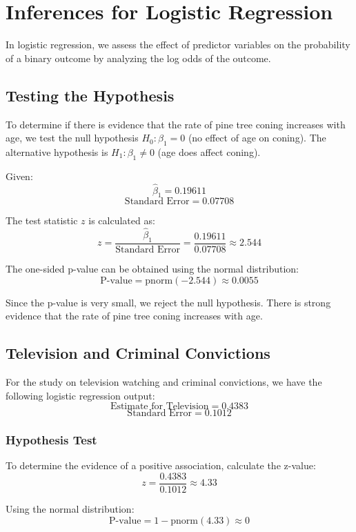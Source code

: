 \documentclass{article}
\begin{document}
\section{Inferences for Logistic Regression}

In logistic regression, we assess the effect of predictor variables on the probability of a binary outcome by analyzing the log odds of the outcome.

\subsection{Testing the Hypothesis}

To determine if there is evidence that the rate of pine tree coning increases with age, we test the null hypothesis \( H_0: \beta_1 = 0 \) (no effect of age on coning). The alternative hypothesis is \( H_1: \beta_1 \neq 0 \) (age does affect coning).

Given:
\[
\hat{\beta}_1 = 0.19611
\]
\[
\text{Standard Error} = 0.07708
\]

The test statistic \( z \) is calculated as:
\[
z = \frac{\hat{\beta}_1}{\text{Standard Error}} = \frac{0.19611}{0.07708} \approx 2.544
\]

The one-sided p-value can be obtained using the normal distribution:
\[
\text{P-value} = \text{pnorm}(-2.544) \approx 0.0055
\]

Since the p-value is very small, we reject the null hypothesis. There is strong evidence that the rate of pine tree coning increases with age.

\subsection{Television and Criminal Convictions}

For the study on television watching and criminal convictions, we have the following logistic regression output:
\[
\text{Estimate for Television} = 0.4383
\]
\[
\text{Standard Error} = 0.1012
\]

\subsubsection{Hypothesis Test}

To determine the evidence of a positive association, calculate the z-value:
\[
z = \frac{0.4383}{0.1012} \approx 4.33
\]

Using the normal distribution:
\[
\text{P-value} = 1 - \text{pnorm}(4.33) \approx 0
\]
\end{document}

